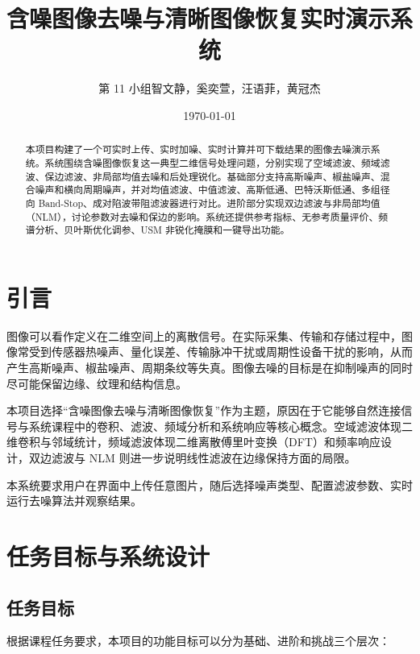 \documentclass[UTF8,a4paper,12pt]{ctexart}
\title{\heiti 含噪图像去噪与清晰图像恢复实时演示系统}
\author{第 11 小组\quad 智文静，奚奕萱，汪语菲，黄冠杰}
\date{\today}
\begin{document}
\pagestyle{fancy}
\maketitle
\thispagestyle{fancy}

\begin{abstract}
本项目构建了一个可实时上传、实时加噪、实时计算并可下载结果的图像去噪演示系统。系统围绕含噪图像恢复这一典型二维信号处理问题，分别实现了空域滤波、频域滤波、保边滤波、非局部均值去噪和后处理锐化。基础部分支持高斯噪声、椒盐噪声、混合噪声和横向周期噪声，并对均值滤波、中值滤波、高斯低通、巴特沃斯低通、多组径向 Band-Stop、成对陷波带阻滤波器进行对比。进阶部分实现双边滤波与非局部均值（NLM），讨论参数对去噪和保边的影响。系统还提供参考指标、无参考质量评价、频谱分析、贝叶斯优化调参、USM 非锐化掩膜和一键导出功能。
\end{abstract}

\clearpage
\tableofcontents
\clearpage
{}
\pagestyle{fancy}

\section{引言}

图像可以看作定义在二维空间上的离散信号。在实际采集、传输和存储过程中，图像常受到传感器热噪声、量化误差、传输脉冲干扰或周期性设备干扰的影响，从而产生高斯噪声、椒盐噪声、周期条纹等失真。图像去噪的目标是在抑制噪声的同时尽可能保留边缘、纹理和结构信息。

本项目选择“含噪图像去噪与清晰图像恢复”作为主题，原因在于它能够自然连接信号与系统课程中的卷积、滤波、频域分析和系统响应等核心概念。空域滤波体现二维卷积与邻域统计，频域滤波体现二维离散傅里叶变换（DFT）和频率响应设计，双边滤波与 NLM 则进一步说明线性滤波在边缘保持方面的局限\cite{gonzalez2018digital,tomasi1998bilateral,buades2005nlm}。

本系统要求用户在界面中上传任意图片，随后选择噪声类型、配置滤波参数、实时运行去噪算法并观察结果。

\section{任务目标与系统设计}

\subsection{任务目标}

根据课程任务要求，本项目的功能目标可以分为基础、进阶和挑战三个层次：
\end{document}
